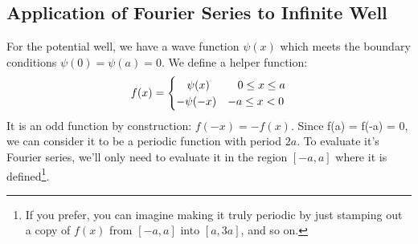 \documentclass[12pt]{book}
\begin{document}
\subsection{Application of Fourier Series to Infinite Well}

For the potential well, we have a wave function $\psi(x)$ which meets the boundary conditions $\psi(0) = \psi(a) = 0$.  We define a helper function:
\begin{equation*}
f(x) = 
\begin{cases}    
  \hspace{9.5pt}\psi(x)  & \hspace{9pt} 0 \leq x \leq a \\
  -\psi(-x) & -a \leq x < 0 \\
\end{cases}   
\end{equation*}
It is an odd function by construction:  $f(-x) = -f(x)$.  Since f(a) = f(-a) = 0, we can consider it to be a periodic function with period $2a$. To evaluate it's Fourier series, we'll only need to evaluate it in the region $[-a,a]$ where it is defined\footnote{If you prefer, you can imagine making it truly periodic by just stamping out a copy of $f(x)$ from $[-a,a]$ into $[a,3a]$, and so on.}.
\end{document}
